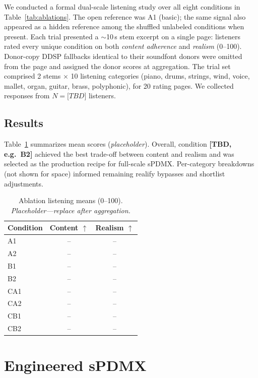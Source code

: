 \documentclass{article}
\begin{document}
We conducted a formal dual-scale listening study over all eight conditions in Table~\ref{tab:ablations}.
The open reference was A1 (basic); the same signal also appeared as a hidden reference among the shuffled unlabeled conditions when present.
Each trial presented a $\sim$10\,s stem excerpt on a single page: listeners rated every unique condition on both \emph{content adherence} and \emph{realism} (0--100).
Donor-copy DDSP fallbacks identical to their soundfont donors were omitted from the page and assigned the donor scores at aggregation.
The trial set comprised 2 stems $\times$ 10 listening categories (piano, drums, strings, wind, voice, mallet, organ, guitar, brass, polyphonic), for 20 rating pages.
We collected responses from $N{=}\textit{[TBD]}$ listeners.

\subsection{Results}
\label{ssec:mushra_results}

Table~\ref{tab:mushra} summarizes mean scores (\textit{placeholder}).
Overall, condition \textbf{[TBD, e.g.\ B2]} achieved the best trade-off between content and realism and was selected as the production recipe for full-scale sPDMX.
Per-category breakdowns (not shown for space) informed remaining realify bypasses and shortlist adjustments.

\begin{table}[t]
\centering
\caption{Ablation listening means (0--100). \textit{Placeholder---replace after aggregation.}}
\label{tab:mushra}
\vspace{1mm}
\small
\begin{tabular}{@{}lcc@{}}
\toprule
Condition & Content $\uparrow$ & Realism $\uparrow$ \\
\midrule
A1  & -- & -- \\
A2  & -- & -- \\
B1  & -- & -- \\
B2  & -- & -- \\
CA1 & -- & -- \\
CA2 & -- & -- \\
CB1 & -- & -- \\
CB2 & -- & -- \\
\bottomrule
\end{tabular}
\end{table}

\section{Engineered sPDMX}
\label{sec:engineered}
\end{document}
